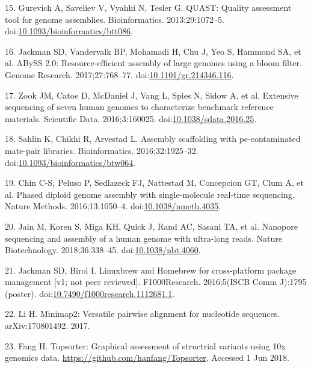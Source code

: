 \documentclass{bmcart}
\begin{document}
\begin{backmatter}
\leavevmode\hypertarget{ref-Gurevich_2013}{}%
15. Gurevich A, Saveliev V, Vyahhi N, Tesler G. QUAST: Quality assessment tool for genome assemblies. Bioinformatics. 2013;29:1072--5. doi:\href{https://doi.org/10.1093/bioinformatics/btt086}{10.1093/bioinformatics/btt086}.

\leavevmode\hypertarget{ref-Jackman_2017}{}%
16. Jackman SD, Vandervalk BP, Mohamadi H, Chu J, Yeo S, Hammond SA, et al. ABySS 2.0: Resource-efficient assembly of large genomes using a bloom filter. Genome Research. 2017;27:768--77. doi:\href{https://doi.org/10.1101/gr.214346.116}{10.1101/gr.214346.116}.

\leavevmode\hypertarget{ref-Zook_2016}{}%
17. Zook JM, Catoe D, McDaniel J, Vang L, Spies N, Sidow A, et al. Extensive sequencing of seven human genomes to characterize benchmark reference materials. Scientific Data. 2016;3:160025. doi:\href{https://doi.org/10.1038/sdata.2016.25}{10.1038/sdata.2016.25}.

\leavevmode\hypertarget{ref-Sahlin_2016}{}%
18. Sahlin K, Chikhi R, Arvestad L. Assembly scaffolding with pe-contaminated mate-pair libraries. Bioinformatics. 2016;32:1925--32. doi:\href{https://doi.org/10.1093/bioinformatics/btw064}{10.1093/bioinformatics/btw064}.

\leavevmode\hypertarget{ref-Chin_2016}{}%
19. Chin C-S, Peluso P, Sedlazeck FJ, Nattestad M, Concepcion GT, Clum A, et al. Phased diploid genome assembly with single-molecule real-time sequencing. Nature Methods. 2016;13:1050--4. doi:\href{https://doi.org/10.1038/nmeth.4035}{10.1038/nmeth.4035}.

\leavevmode\hypertarget{ref-Jain_2018}{}%
20. Jain M, Koren S, Miga KH, Quick J, Rand AC, Sasani TA, et al. Nanopore sequencing and assembly of a human genome with ultra-long reads. Nature Biotechnology. 2018;36:338--45. doi:\href{https://doi.org/10.1038/nbt.4060}{10.1038/nbt.4060}.

\leavevmode\hypertarget{ref-Jackman_2016}{}%
21. Jackman SD, Birol I. Linuxbrew and Homebrew for cross-platform package management {[}v1; not peer reviewed{]}. F1000Research. 2016;5(ISCB Comm J):1795 (poster). doi:\href{https://doi.org/10.7490/f1000research.1112681.1}{10.7490/f1000research.1112681.1}.

\leavevmode\hypertarget{ref-Li_2017}{}%
22. Li H. Minimap2: Versatile pairwise alignment for nucleotide sequences. arXiv:170801492. 2017.

\leavevmode\hypertarget{ref-URL_JupiterPlot}{}%
23. Fang H. Topsorter: Graphical assessment of structrial variants using 10x genomics data. \url{https://github.com/hanfang/Topsorter}. Accessed 1 Jun 2018.


\end{backmatter}
\end{document}
